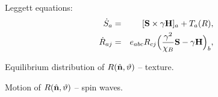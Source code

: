 \parbox[t]{26cm}{

Leggett equations:
\begin{eqnarray*}
\dot S_a &=&
  [{\bf S}\times \gamma {\bf H}]_a + T_a(R),
\\
\dot R_{aj} &=&
  e_{abc} R_{cj} \Big(\frac{\gamma^2}{\chi_B} {\bf S} - \gamma {\bf H} \Big)_b,
\end{eqnarray*}

\bigskip
Equilibrium distribution of $R(\hat {\bf n}, \vartheta)$ -- texture.

\medskip
Motion of $R(\hat{\bf n}, \vartheta)$ -- spin waves.


}